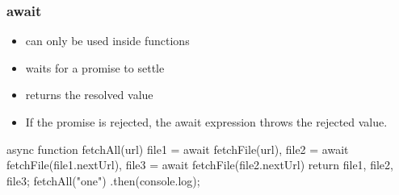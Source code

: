 \begin{frame}[fragile] \frametitle{await}
\begin{itemize}
  \item can only be used inside  functions
  \item waits for a promise to settle
  \item returns the resolved value
  \item If the promise is rejected, the await expression throws the rejected value.
\end{itemize}
\vspace{5mm}
\begin{CodeBox}{}
async function fetchAll(url) {
  file1 = await fetchFile(url),
  file2 = await fetchFile(file1.nextUrl),
  file3 = await fetchFile(file2.nextUrl)
  return {file1, file2, file3};
}
fetchAll("one")
.then(console.log);
\end{CodeBox}
\end{frame}

